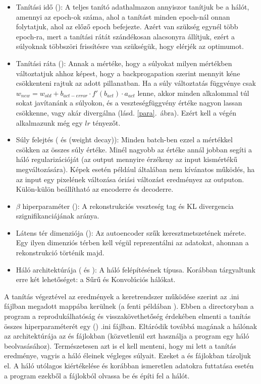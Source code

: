 \begin{itemize}
  \item Tanítási idő (): A teljes tanító adathalmazon annyiszor tanítjuk be a hálót, amennyi az epoch-ok száma, ahol a tanítást minden epoch-nál onnan folytatjuk, ahol az előző epoch befejezte. Azért van szükség egynél több epoch-ra, mert a tanítási rátát szándékosan alacsonyra állítjuk, ezért a súlyoknak többszöri frissítésre van szükségük, hogy elérjék az optimumot.
  \item Tanítási ráta (): Annak a mértéke, hogy a súlyokat milyen mértékben változtatjuk ahhoz képest, hogy a backprogapation szerint mennyit kéne csökkenteni rajtuk az adott pillanatban. Ha a súly változtatás függvénye csak $w_{new} =  w_{old} + b_{act-error} \cdot f'(b_{act}) \cdot a_{act}$ lenne, akkor minden alkalommal túl sokat javítanánk a súlyokon, és a veszteségfüggvény értéke nagyon lassan csökkenne, vagy akár divergálna (lásd. \ref{para}.~ábra). Ezért kell a végén alkalmazunk még egy $lr$ tényezőt.
  \item Súly felejtés ( és  (weight decay)): Minden batch-ben ezzel a mértékkel csökken az összes súly értéke. Minél nagyobb az értéke annál jobban segíti a háló regularizációját (az output mennyire érzékeny az input kismértékű megváltozására). Képek esetén például általában nem kívánatos működés, ha az input egy pixelének változása óriási változást eredményez az outputon. Külön-külön beállítható az encoderre és decoderre.
  \item $\beta$ hiperparaméter  (): A rekonstrukciós veszteség tag és KL divergencia szignifikanciájának aránya.
  \item Látens tér dimenziója (): Az autoencoder szűk keresztmetszetének mérete. Egy ilyen dimenziós térben kell végül reprezentálni az adatokat, ahonnan a rekonstrukció történik majd.
  \item Háló architektúrája ( és ): A háló felépítésének típusa. Korábban tárgyaltunk erre két lehetőséget: a Sűrű és Konvolúciós hálókat.
\end{itemize}

A tanítás végeztével az eredmények a keretrendszer működése szerint az .ini fájlban megadott  mappába kerülnek (a fenti példában ). Ebben a directoryban a program a reprodukálhatóság és visszakövethetőség érdekében elmenti a tanítás összes hiperparaméterét egy () .ini fájlban. Eltáródik továbbá magának a hálónak az architektúrája az  és  fájlokban (közvetlenül ezt használja a program egy háló beolvasásához). Természetesen azt is el kell menteni, hogy mi lett a tanítás eredménye, vagyis a háló éleinek végleges súlyait. Ezeket a  és  fájlokban tároljuk el. A háló utólagos kiértékelése és korábban ismeretlen adatokra futtatása esetén a program ezekből a fájlokból olvassa be és építi fel a hálót.

